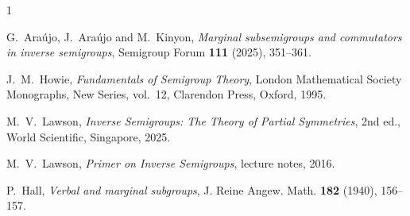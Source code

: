 \documentclass[11pt,a4paper,reqno]{amsart}
\numberwithin{equation}{section}
\begin{document}
\begin{thebibliography}{1}

 G.~Ara\'ujo, J.~Ara\'ujo and M.~Kinyon, \emph{Marginal subsemigroups and commutators in inverse semigroups}, Semigroup Forum \textbf{111} (2025), 351--361. 


 J.~M.~Howie, \emph{Fundamentals of Semigroup Theory}, London Mathematical Society Monographs, New Series, vol.~12, Clarendon Press, Oxford, 1995.


 M.~V.~Lawson, \emph{Inverse Semigroups: The Theory of Partial Symmetries}, 2nd ed., World Scientific, Singapore, 2025. 

 M.~V.~Lawson, \emph{Primer on Inverse Semigroups}, lecture notes, 2016. 

 P.~Hall, \emph{Verbal and marginal subgroups}, J. Reine Angew. Math. \textbf{182} (1940), 156--157.
\end{thebibliography}
\end{document}
